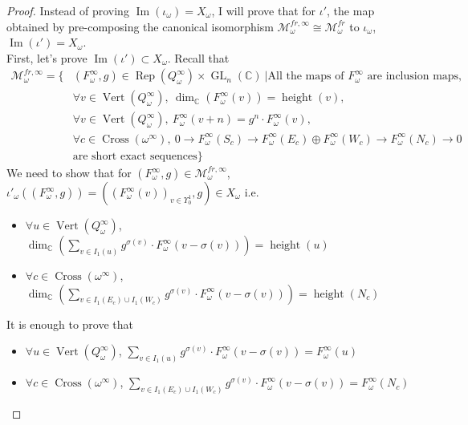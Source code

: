 \begin{proof}
Instead of proving $\operatorname{Im}(\iota_\omega) = X_\omega$, I will prove that for $\iota'$, the map obtained by pre-composing the canonical isomorphism $\mathcal{M}_\omega^{fr,\infty}\cong \mathcal{M}_\omega^{fr}$ to $\iota_\omega$, $\operatorname{Im}(\iota') = X_\omega$.\\
First, let's prove $\operatorname{Im}(\iota')\subset X_\omega$. Recall that
\begin{align*}
\mathcal{M}_\omega^{fr,\infty} = \{
& (F_\omega^\infty,g)\in \operatorname{Rep}(Q_\omega^\infty)\times \operatorname{GL}_n(\mathbb{C})~|\text{All the maps of }F_\omega^\infty\text{ are inclusion maps},\\
&\forall v\in \operatorname{Vert}(Q_\omega^\infty),~\operatorname{dim}_\mathbb{C}(F_\omega^\infty(v)) = \operatorname{height}(v),\\
&\forall v\in \operatorname{Vert}(Q_\omega^\infty),~F_\omega^\infty(v+n) = g^n \cdot F_\omega^\infty(v),\\
&\forall c\in \operatorname{Cross}(\omega^\infty),~0\rightarrow F_\omega^\infty(S_c)\rightarrow F_\omega^\infty(E_c)\oplus F_\omega^\infty(W_c)\rightarrow F_\omega^\infty(N_c)\rightarrow 0 \\
&\text{are short exact sequences}
\}
\end{align*}
We need to show that for $(F_\omega^\infty,g)\in \mathcal{M}_\omega^{fr,\infty}$, $\iota'_\omega ((F_\omega^\infty,g)) = ((F_\omega^\infty(v))_{v\in \Upsilon_0^1},g)\in X_\omega$ i.e. 
\begin{itemize}
\item $\forall u \in \operatorname{Vert}(Q_\omega^\infty)$, $\operatorname{dim}_\mathbb{C}(\sum_{v\in I_1(u)} g^{\sigma(v)}\cdot F_\omega^\infty(v-\sigma(v))) = \operatorname{height}(u)$
\item $\forall c \in \operatorname{Cross}(\omega ^\infty)$, $\operatorname{dim}_\mathbb{C}(\sum_{v\in I_1(E_c)\cup I_1(W_c)} g^{\sigma(v)}\cdot F_\omega^\infty(v-\sigma(v))) = \operatorname{height}(N_c)$
\end{itemize}
It is enough to prove that
\begin{itemize}
\item $\forall u \in \operatorname{Vert}(Q_\omega^\infty)$, $\sum_{v\in I_1(u)} g^{\sigma(v)}\cdot F_\omega^\infty(v-\sigma(v)) = F_\omega^\infty(u)$
\item $\forall c \in \operatorname{Cross}(\omega ^\infty)$, $\sum_{v\in I_1(E_c)\cup I_1(W_c)} g^{\sigma(v)}\cdot F_\omega^\infty(v-\sigma(v)) = F_\omega^\infty(N_c)$

\end{itemize}
\end{proof}
